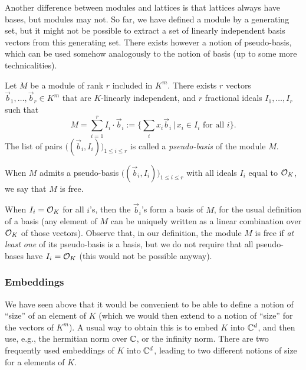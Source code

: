 Another difference between modules and lattices is that lattices always have bases, but modules may not. So far, we have defined a module by a generating set, but it might not be possible to extract a set of linearly independent basis vectors from this generating set. There exists however a notion of pseudo-basis, which can be used somehow analogously to the notion of basis (up to some more technicalities).

\begin{lemma}
Let $M$ be a module of rank $r$ included in $K^m$. There exists $r$ vectors $\vec b_1, \dots, \vec b_r \in K^m$ that are $K$-linearly independent, and $r$ fractional ideals $I_1, \dots, I_r$ such that
\[ M = \sum_{i = 1}^r I_i \cdot \vec b_i := \{ \sum_i x_i \vec b_i \,|\, x_i \in I_i \text{ for all }i\}.\]
The list of pairs $\big((\vec b_i, I_i)\big)_{1 \leq i \leq r}$ is called a \emph{pseudo-basis} of the module $M$.
\end{lemma}

\begin{definition}
When $M$ admits a pseudo-basis $\big((\vec b_i, I_i)\big)_{1 \leq i \leq r}$ with all ideals $I_i$ equal to $\mathcal{O}_K$, we say that $M$ is free.
\end{definition}
When $I_i = \mathcal{O}_K$ for all $i$'s, then the $\vec b_i$'s form a basis of $M$, for the usual definition of a basis (any element of $M$ can be uniquely written as a linear combination over $\mathcal{O}_K$ of those vectors). Observe that, in our definition, the module $M$ is free if \emph{at least one} of its pseudo-basis is a basis, but we do not require that all pseudo-bases have $I_i = \mathcal{O}_K$ (this would not be possible anyway).

\subsubsection{Embeddings}
\label{sec:embeddings}
We have seen above that it would be convenient to be able to define a notion of ``size'' of an element of $K$ (which we would then extend to a notion of ``size'' for the vectors of $K^m$). A usual way to obtain this is to embed $K$ into $\mathbb{C}^d$, and then use, e.g., the hermitian norm over $\mathbb{C}$, or the infinity norm. There are two frequently used embeddings of $K$ into $\mathbb{C}^d$, leading to two different notions of size for a elements of $K$.

